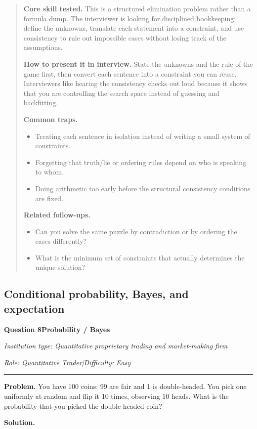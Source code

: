 \documentclass[11pt,letterpaper,openany]{book}
\newenvironment{EditorialNote}
  {\begin{quote}\small\setlength{\parskip}{0.25em}}
  {\end{quote}}
\newcommand{\QuestionSpacer}{\vspace{0.4em}}
\newcommand{\InterviewQuestionHeader}[5]{%
  \vspace{1.0em}%
  {\large\bfseries #1\enspace #4\par}%
  {\small\itshape Institution type: #2\par}%
  {\small\itshape Role: #3\enspace |\enspace Difficulty: #5\par}%
  \vspace{0.25em}\hrule\vspace{0.45em}%
}
\begin{document}
\begin{EditorialNote}


\textbf{Core skill tested.} This is a structured elimination problem rather than a formula dump. The interviewer is looking for disciplined bookkeeping: define the unknowns, translate each statement into a constraint, and use consistency to rule out impossible cases without losing track of the assumptions.

\textbf{How to present it in interview.} State the unknowns and the rule of the game first, then convert each sentence into a constraint you can reuse. Interviewers like hearing the consistency checks out loud because it shows that you are controlling the search space instead of guessing and backfitting.

\textbf{Common traps.}
\begin{itemize}
\item Treating each sentence in isolation instead of writing a small system of constraints.
\item Forgetting that truth/lie or ordering rules depend on who is speaking to whom.
\item Doing arithmetic too early before the structural consistency conditions are fixed.
\end{itemize}

\textbf{Related follow-ups.}
\begin{itemize}
\item Can you solve the same puzzle by contradiction or by ordering the cases differently?
\item What is the minimum set of constraints that actually determines the unique solution?
\end{itemize}


\end{EditorialNote}
\QuestionSpacer

\subsection{Conditional probability, Bayes, and expectation}

\InterviewQuestionHeader{Question 8}{Quantitative proprietary trading and market-making firm}{Quantitative Trader}{Probability / Bayes}{Easy}
\textbf{Problem.} You have 100 coins: 99 are fair and 1 is double-headed. You pick one uniformly at random and flip it 10 times, observing 10 heads. What is the probability that you picked the double-headed coin?

\textbf{Solution.}
\end{document}
